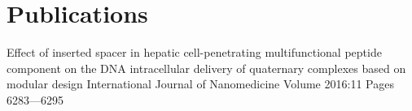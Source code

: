 \section{Publications}


	\publicationgroup
	{Effect of inserted spacer in hepatic cell-penetrating multifunctional peptide component on the DNA intracellular delivery of quaternary complexes based on modular design}
	{ International Journal of Nanomedicine Volume 2016:11 Pages 6283—6295  }

